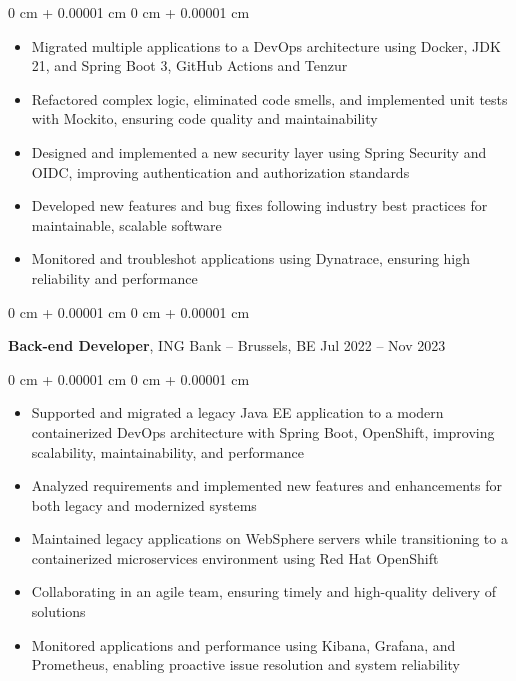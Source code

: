 \documentclass[10pt, letterpaper]{article}
\newenvironment{highlights}{
    \begin{itemize}[
        topsep=0.10 cm,
        parsep=0.10 cm,
        partopsep=0pt,
        itemsep=0pt,
        leftmargin=0 cm + 10pt
    ]
}{
    \end{itemize}
} %
\newenvironment{onecolentry}{
    \begin{adjustwidth}{
        0 cm + 0.00001 cm
    }{
        0 cm + 0.00001 cm
    }
}{
    \end{adjustwidth}
} %
\newenvironment{twocolentry}[2][]{
    \onecolentry
    \def\secondColumn{#2}
    \setcolumnwidth{\fill, 4.5 cm}
    \begin{paracol}{2}
}{
    \switchcolumn \raggedleft \secondColumn
    \end{paracol}
    \endonecolentry
} %
\begin{document}
        \vspace{0.10 cm}
        
        \begin{onecolentry}
            \begin{highlights}
                \item Migrated multiple applications to a DevOps architecture using Docker, JDK 21, and Spring Boot 3, GitHub Actions and Tenzur
                \item Refactored complex logic, eliminated code smells, and implemented unit tests with Mockito, ensuring code quality and maintainability
                \item Designed and implemented a new security layer using Spring Security and OIDC, improving authentication and authorization standards
                \item Developed new features and bug fixes following industry best practices for maintainable, scalable software
                \item Monitored and troubleshot applications using Dynatrace, ensuring high reliability and performance
            \end{highlights}
        \end{onecolentry}
        
        \vspace{0.2 cm}

        \begin{twocolentry}{
            Jul 2022 – Nov 2023
        }
            \textbf{Back-end Developer}, ING Bank -- Brussels, BE\end{twocolentry}

        \vspace{0.10 cm}
        
        \begin{onecolentry}
            \begin{highlights}
                \item Supported and migrated a legacy Java EE application to a modern containerized DevOps architecture with Spring Boot, OpenShift, improving scalability, maintainability, and performance
                \item Analyzed requirements and implemented new features and enhancements for both legacy and modernized systems
                \item Maintained legacy applications on WebSphere servers while transitioning to a containerized microservices environment using Red Hat OpenShift
                \item Collaborating in an agile team, ensuring timely and high-quality delivery of solutions
                \item Monitored applications and performance using Kibana, Grafana, and Prometheus, enabling proactive issue resolution and system reliability
            \end{highlights}
        \end{onecolentry}
        
\end{document}
